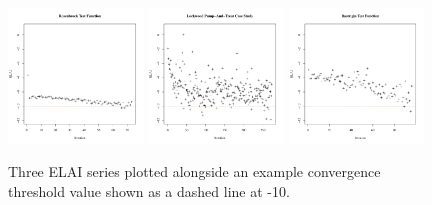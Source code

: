 \documentclass[12pt]{article}
\begin{document}
\clearpage
%
%
\begin{figure}
\includegraphics[width=0.32\textwidth]{./figures/introChartRoseEasyEasyAxis.pdf}
\includegraphics[width=0.32\textwidth]{./figures/introChartLock6Three20000Axis.pdf}
\includegraphics[width=0.32\textwidth]{./figures/introChartRastHardAxis.pdf}
\caption{
%
Three ELAI series plotted alongside an example convergence threshold value shown as 
a dashed line at -10.
}
\label{introFig}
\end{figure}
%
%
\end{document}
